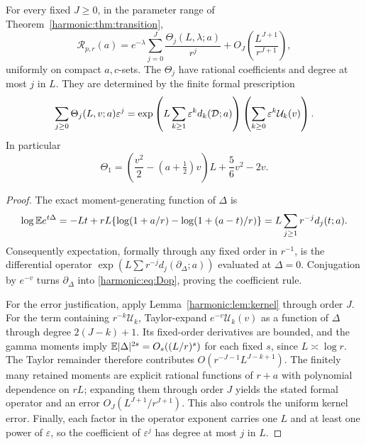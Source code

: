 \begin{theorem}\label{harmonic:thm:allorders}
For every fixed $J\ge0$, in the parameter range of Theorem~\ref{harmonic:thm:transition},
\begin{equation}\label{harmonic:eq:allorders}
 \mathcal R_{p,r}(a)=e^{-\lambda}
 \sum_{j=0}^J\frac{\Theta_j(L,\lambda;a)}{r^j}
 +O_{J}\left(\frac{L^{J+1}}{r^{J+1}}\right),
\end{equation}
uniformly on compact $a,c$-sets. The $\Theta_j$ have rational coefficients and degree at most $j$ in $L$. They are determined by the finite formal prescription
\begin{equation}\label{harmonic:eq:Pcompiler}
 \sum_{j\ge0}\Theta_j(L,v;a)\varepsilon^j
 =\exp\left(L\sum_{k\ge1}\varepsilon^k d_k(\mathcal D;a)\right)
       \left(\sum_{k\ge0}\varepsilon^k\mathcal U_k(v)\right).
\end{equation}
In particular
\begin{equation}\label{harmonic:eq:P1}
 \Theta_1=\left(\frac{v^2}{2}-(a+\tfrac12)v\right)L+\frac56v^2-2v.
\end{equation}
\end{theorem}
\begin{proof}
The exact moment-generating function of $\Delta$ is
\[
 \log\mathbb E e^{t\Delta}
 =-Lt+rL\{\log(1+a/r)-\log(1+(a-t)/r)\}
 =L\sum_{j\ge1}r^{-j}d_j(t;a).
\]
Consequently expectation, formally through any fixed order in $r^{-1}$, is the differential operator
$\exp(L\sum r^{-j}d_j(\partial_\Delta;a))$ evaluated at $\Delta=0$. Conjugation by $e^{-v}$ turns $\partial_\Delta$ into \eqref{harmonic:eq:Dop}, proving the coefficient rule.

For the error justification, apply Lemma~\ref{harmonic:lem:kernel} through order $J$. For the term containing $r^{-k}\mathcal U_k$, Taylor-expand $e^{-v}\mathcal U_k(v)$ as a function of $\Delta$ through degree $2(J-k)+1$. Its fixed-order derivatives are bounded, and the gamma moments imply
$\mathbb E|\Delta|^{2s}=O_s((L/r)^s)$ for each fixed $s$, since $L\asymp\log r$. The Taylor remainder therefore contributes
$O(r^{-J-1}L^{J-k+1})$. The finitely many retained moments are explicit rational functions of $r+a$ with polynomial dependence on $rL$; expanding them through order $J$ yields the stated formal operator and an error $O_J(L^{J+1}/r^{J+1})$. This also controls the uniform kernel error. Finally, each factor in the operator exponent carries one $L$ and at least one power of $\varepsilon$, so the coefficient of $\varepsilon^j$ has degree at most $j$ in $L$.
\end{proof}

